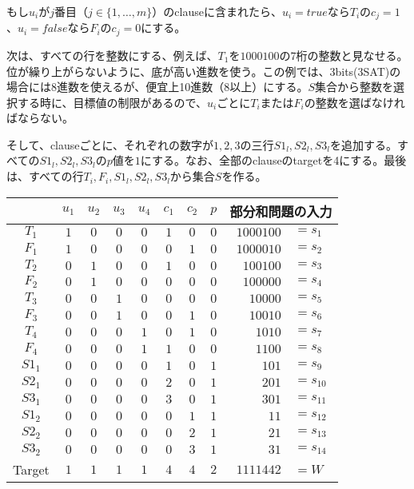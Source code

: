 \documentclass{jsarticle}
\begin{document}
もし$u_{i}$が$j$番目（$j\in \{1,\dots,m\}$）のclauseに含まれたら、$u_{i}=true$なら$T_{i}$の$c_{j}=1$、$u_{i}=false$なら$F_{i}$の$c_{j}=0$にする。

次は、すべての行を整数にする、例えば、$T_{1}$を$1000100$の7桁の整数と見なせる。位が繰り上がらないように、底が高い進数を使う。この例では、3bits(3SAT)の場合には8進数を使えるが、便宜上10進数（8以上）にする。$S$集合から整数を選択する時に、目標値の制限があるので、$u_{i}$ごとに$T_{i}$または$F_{i}$の整数を選ばなければならない。

そして、clauseごとに、それぞれの数字が$1,2,3$の三行$S1_{l},S2_{l},S3_{l}$を追加する。すべての$S1_{l},S2_{l},S3_{l}$の$p$値を$1$にする。なお、全部のclauseのtargetを4にする。最後は、すべての行$T_{i},F_{i},S1_{l},S2_{l},S3_{l}$から集合$S$を作る。

\begin{center}
\begin{tabular}{ c| c c c c c c| c |r l }
  &  $u_{1}$ & $u_{2}$ & $u_{3}$ & $u_{4}$ & $c_{1}$ & $c_{2}$ & $p$ &\multicolumn{2}{c}{部分和問題の入力}\\
   \hline  
  $T_{1}$ & $1$ & $0$ & $0$ & $0$ & $1$ & $0$ & $0$ & $1000100$ & $=s_{1}$\\
  $F_{1}$ & $1$ & $0$ & $0$ & $0$ & $0$ & $1$ & $0$ & $1000010$ & $=s_{2}$\\
  $T_{2}$ & $0$ & $1$ & $0$ & $0$ & $1$ & $0$ & $0$ & $100100$ & $=s_{3}$\\
  $F_{2}$ & $0$ & $1$ & $0$ & $0$ & $0$ & $0$ & $0$ & $100000$ & $=s_{4}$\\
  $T_{3}$ & $0$ & $0$ & $1$ & $0$ & $0$ & $0$ & $0$ & $10000$ & $=s_{5}$\\
  $F_{3}$ & $0$ & $0$ & $1$ & $0$ & $0$ & $1$ & $0$ & $10010$ & $=s_{6}$\\
  $T_{4}$ & $0$ & $0$ & $0$ & $1$ & $0$ & $1$ & $0$ & $1010$ & $=s_{7}$\\
  $F_{4}$ & $0$ & $0$ & $0$ & $1$ & $1$ & $0$ & $0$ & $1100$ & $=s_{8}$\\
  $S1_{1}$ & $0$ & $0$ & $0$ & $0$ & $1$ & $0$ & $1$ & $101$ & $=s_{9}$\\
  $S2_{1}$ & $0$ & $0$ & $0$ & $0$ & $2$ & $0$ & $1$ & $201$ & $=s_{10}$\\
  $S3_{1}$ & $0$ & $0$ & $0$ & $0$ & $3$ & $0$ & $1$ & $301$ & $=s_{11}$\\
  $S1_{2}$ & $0$ & $0$ & $0$ & $0$ & $0$ & $1$ & $1$ & $11$ & $=s_{12}$\\
  $S2_{2}$ & $0$ & $0$ & $0$ & $0$ & $0$ & $2$ & $1$ & $21$ & $=s_{13}$\\
  $S3_{2}$ & $0$ & $0$ & $0$ & $0$ & $0$ & $3$ & $1$ & $31$ & $=s_{14}$\\
  \hline
  Target & $1$ & $1$ & $1$ & $1$ & $4$ & $4$ & $2$ & $1111442$ & $=W$\\

\end{tabular}
\end{center}
\end{document}
